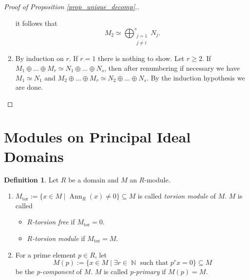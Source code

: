 \documentclass[12pt,a4paper]{report}
\theoremstyle{definition}
\newtheorem{defn}[theorem]{Definition}
\theoremstyle{num.custom-title}
\DeclareMathOperator{\tor}{tor}
\DeclareMathOperator{\Ann}{Ann}
\DeclareMathOperator{\N}{\mathbb{N}}
\DeclareMathOperator{\sse}{\subseteq}
\begin{document}
\begin{proof}[Proof of Proposition \ref{prop_unique_decomp}.]
\begin{enumerate}
it follows that
\[
M_2 \simeq \bigoplus_{\substack{j=1 \\ j \neq i}}^s N_j.
\]
\item By induction on $r$. If $r=1$ there is nothing to show. Let $r \geq 2$. If $M_1 \oplus \ldots \oplus M_r \simeq N_1 \oplus \ldots \oplus N_s$, then after renumbering if necessary we have $M_1 \simeq N_1$ and $M_2 \oplus \ldots \oplus M_r \simeq N_2 \oplus \ldots \oplus N_s$. By the induction hypothesis we are done.
\end{enumerate}
\end{proof}


\section{Modules on Principal Ideal Domains}

\begin{defn}
Let $R$ be a domain and $M$ an $R$-module.
\begin{enumerate}
\item $M_{\tor} := \{x \in M \mid \Ann_R(x) \neq 0\} \sse M$ is called \emph{torsion module} of $M$. $M$ is called
\begin{itemize}
\item \emph{$R$-torsion free} if $M_{\tor}=0$.
\item \emph{$R$-torsion module} if $M_{\tor} = M$.
\end{itemize}
\item For a prime element $p \in R$, let
\[
M(p) := \{x \in M \mid \exists r \in \N \text{ such that } p^r x = 0\} \sse M
\]
be the \emph{p-component} of $M$. $M$ is called \emph{p-primary} if $M(p)=M$.
\end{enumerate}
\end{defn}
\end{document}
